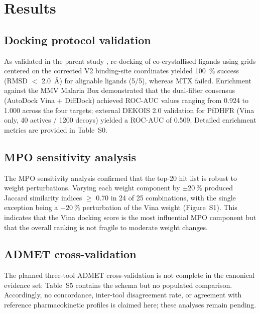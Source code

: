 \documentclass[11pt,a4paper]{article}
\begin{document}

\section{Results}

\subsection{Docking protocol validation}

As validated in the parent study \citep{temgoua2026antimalarial}, re-docking of co-crystallised ligands using grids centered on the corrected V2 binding-site coordinates yielded \qty{100}{\percent} success (RMSD $<$ \SI{2.0}{\angstrom}) for alignable ligands (5/5), whereas MTX failed. Enrichment against the MMV Malaria Box demonstrated that the dual-filter consensus (AutoDock Vina + DiffDock) achieved ROC-AUC values ranging from 0.924 to 1.000 across the four targets; external DEKOIS 2.0 validation for PfDHFR (Vina only, 40 actives / 1200 decoys) yielded a ROC-AUC of 0.509. Detailed enrichment metrics are provided in Table~S0.

\subsection{MPO sensitivity analysis}

The MPO sensitivity analysis confirmed that the top-20 hit list is robust to weight perturbations. Varying each weight component by $\pm\qty{20}{\percent}$ produced Jaccard similarity indices $\geq$ 0.70 in 24 of 25 combinations, with the single exception being a $-\qty{20}{\percent}$ perturbation of the Vina weight (Figure~S1). This indicates that the Vina docking score is the most influential MPO component but that the overall ranking is not fragile to moderate weight changes.

\subsection{ADMET cross-validation}

The planned three-tool ADMET cross-validation is not complete in the canonical evidence set: Table~S5 contains the schema but no populated comparison. Accordingly, no concordance, inter-tool disagreement rate, or agreement with reference pharmacokinetic profiles is claimed here; these analyses remain pending.
\end{document}

